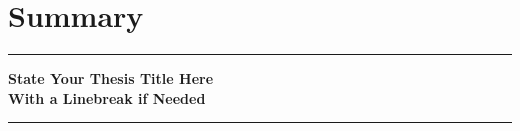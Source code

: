 \chapter*{Summary} %


\begin{center}
\rule{\textwidth}{.75pt}\vspace*{1mm}
\textbf{{\Large State Your Thesis Title Here\\[2mm] With a Linebreak if Needed}}
\rule{\textwidth}{.75pt}
\end{center}
\vspace*{2ex}


\lipsum[1-4]

